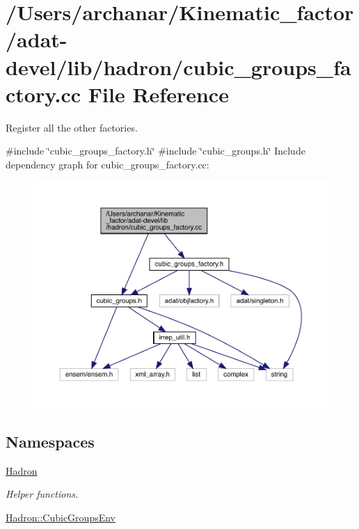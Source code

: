 \hypertarget{adat-devel_2lib_2hadron_2cubic__groups__factory_8cc}{}\section{/\+Users/archanar/\+Kinematic\+\_\+factor/adat-\/devel/lib/hadron/cubic\+\_\+groups\+\_\+factory.cc File Reference}
\label{adat-devel_2lib_2hadron_2cubic__groups__factory_8cc}


Register all the other factories.  


{\ttfamily \#include \char`\"{}cubic\+\_\+groups\+\_\+factory.\+h\char`\"{}}\newline
{\ttfamily \#include \char`\"{}cubic\+\_\+groups.\+h\char`\"{}}\newline
Include dependency graph for cubic\+\_\+groups\+\_\+factory.\+cc\+:
\nopagebreak
\begin{figure}[H]
\begin{center}
\leavevmode
\includegraphics[width=350pt]{df/d39/adat-devel_2lib_2hadron_2cubic__groups__factory_8cc__incl}
\end{center}
\end{figure}
\subsection*{Namespaces}
\begin{DoxyCompactItemize}
\item 
 \mbox{\hyperlink{namespaceHadron}{Hadron}}
\begin{DoxyCompactList}\small\item\em Helper functions. \end{DoxyCompactList}\item 
 \mbox{\hyperlink{namespaceHadron_1_1CubicGroupsEnv}{Hadron\+::\+Cubic\+Groups\+Env}}
\end{DoxyCompactItemize}
